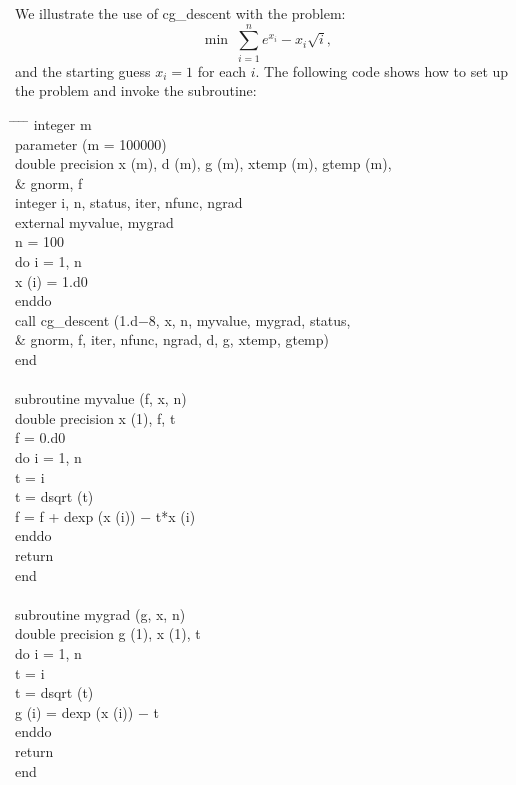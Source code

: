 \documentclass [12pt] {article}
\begin{document}
We illustrate the use of {\sc cg\_descent} with the problem:
%
\[
\min \; \sum_{i = 1}^n e^{x_i} - x_i \sqrt{i} ,
\]
%
and the starting guess $x_i = 1$ for each $i$.
The following code shows how to
set up the problem and invoke the subroutine:
\begin{tabbing}
\hspace{2em} \= \hspace{2em} \= \hspace{1em} \= \hspace{2em} \= \kill
\>\>\> \sc integer m \\
\>\>\> \sc parameter (m = 100000) \\
\>\>\> \sc double precision x (m), d (m), g (m), xtemp (m), gtemp (m), \\
\>\>\&\> \>\sc gnorm, f \\
\>\>\> \sc integer i, n, status, iter, nfunc, ngrad \\
\>\>\> \sc external myvalue, mygrad \\
\>\>\> \sc n = 100 \\
\>\>\> \sc do i = 1, n \\
\>\>\>\> \sc x (i) = 1.d0 \\
\>\>\> \sc enddo \\
\>\>\> \sc call cg\_descent (1.d$-$8, x, n, myvalue, mygrad, status,\\
\>\>   \&\>\>  \sc     gnorm, f, iter, nfunc, ngrad, d, g, xtemp, gtemp) \\
\>\>\> \sc end \\
\>\\
\>\>\> \sc subroutine myvalue (f, x, n) \\
\>\>\>  \sc double precision x (1), f, t \\
\>\>\>\sc  f = 0.d0 \\
\>\>\>  \sc do i = 1, n \\
\>\>\>\> \sc t = i \\
\>\>\>\> \sc t = dsqrt (t) \\
\>\>\>\> \sc f = f +  dexp (x (i)) $-$ t*x (i) \\
\>\>\> \sc enddo \\
\>\>\> \sc return \\
\>\>\> \sc end \\
\\
\>\>\> \sc subroutine mygrad (g, x, n) \\
\>\>\> \sc double precision g (1), x (1), t \\
\>\>\> \sc do i = 1, n \\
\>\>\>\> \sc t = i \\
\>\>\>\> \sc t = dsqrt (t) \\
\>\>\>\> \sc g (i) = dexp (x (i)) $-$ t \\
\>\>\> \sc enddo \\
\>\>\> \sc return \\
\>\>\> \sc end
\end{tabbing}
\end{document}
